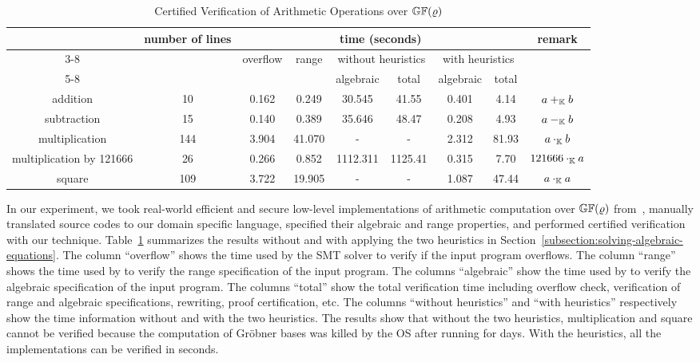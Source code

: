 \begin{table*}
  \caption{Certified Verification of Arithmetic Operations over
    $\mathbb{GF}(\varrho)$}
  \centering
  \begin{tabular}{|c|c|c|c|c|c|c|c|c|}
    \hline
    \multirow{3}{*}{} & \multirow{3}{*}{number of lines} & \multicolumn{6}{|c|}{time (seconds)} & \multirow{3}{*}{remark} \\ \cline{3-8}
    & & \multirow{2}{*}{overflow} & \multirow{2}{*}{range} & \multicolumn{2}{|c|}{without heuristics} & \multicolumn{2}{|c|}{with heuristics} & \\ \cline{5-8}
    & & & & algebraic & total & algebraic & total & \\
    \hline
    addition                 & 10  & 0.162 & 0.249 & 30.545 & 41.55 & 0.401 & 4.14 & $a +_{\mathbb{K}} b$ \\
    \hline
    subtraction              & 15  & 0.140 & 0.389 & 35.646 & 48.47 & 0.208 & 4.93 & $a -_{\mathbb{K}} b$ \\
    \hline
    multiplication           & 144 & 3.904 & 41.070 & - & - & 2.312 & 81.93 & $a \cdot_{\mathbb{K}} b$\\
    \hline
    multiplication by 121666 & 26  & 0.266 & 0.852 & 1112.311 & 1125.41 & 0.315 & 7.70 & $121666 \cdot_{\mathbb{K}} a$\\
    \hline
    square                   & 109 & 3.722 & 19.905  & - & - & 1.087 & 47.44 & $a \cdot_{\mathbb{K}} a$\\
    \hline
  \end{tabular}
  \label{table:arithmetic-operations}
\end{table*}

In our experiment, we took real-world efficient and secure
low-level implementations of arithmetic computation over
$\mathbb{GF}(\varrho)$ from~\cite{BDL+:11:HSHSS,BDL+:12:HSHSS},
manually translated source
codes to our domain specific language, specified their algebraic and range
properties, and performed certified verification with our technique.
Table~\ref{table:arithmetic-operations} summarizes the results
without and with applying the two heuristics in Section~\ref{subsection:solving-algebraic-equations}.
The column ``overflow'' shows the time used by the SMT solver \boolector to verify if the input program overflows.
The column ``range'' shows the time used by \boolector to verify the range specification of the input program.
The columns ``algebraic'' show the time used by \singular to verify the algebraic specification of the input program.
The columns ``total'' show the total verification time including overflow check, verification of range and algebraic specifications, rewriting, proof certification, etc.
The columns ``without heuristics'' and ``with heuristics'' respectively show the time information without and with the two heuristics.
The results show that without the two heuristics, multiplication and square
cannot be verified because the computation of Gr\"obner bases was killed by the OS
after running for days.
With the heuristics, all the implementations can be verified in seconds.





